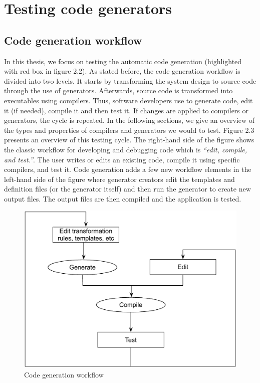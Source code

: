 \section{Testing code generators}
\subsection{Code generation workflow}
In this thesis, we focus on testing the automatic code generation (highlighted with red box in figure 2.2). As stated before, the code generation workflow is divided into two levels. It starts by transforming the system design to source code through the use of generators. Afterwards, source code is transformed into executables using compilers. Thus, software developers use to generate code, edit it (if needed), compile it and then test it. If changes are applied to compilers or generators, the cycle is repeated. In the following sections, we give an overview of the types and properties of compilers and generators we would to test. Figure 2.3 presents an overview of this testing cycle. The right-hand side of the figure shows the classic workflow for developing and debugging code which is \textit{“edit, compile, and test.”}. The user writes or edits an existing code, compile it using specific compilers, and test it. Code generation adds a few new workflow elements in the left-hand side of the figure where generator creators edit the templates and definition files (or the generator itself) and then run the generator to create new output files. The output files are then compiled and the application is tested. 
\begin{figure}[h]
	\center
	\includegraphics[scale=1]{Background/fig/workflow}
	\caption{Code generation workflow}
\end{figure}

